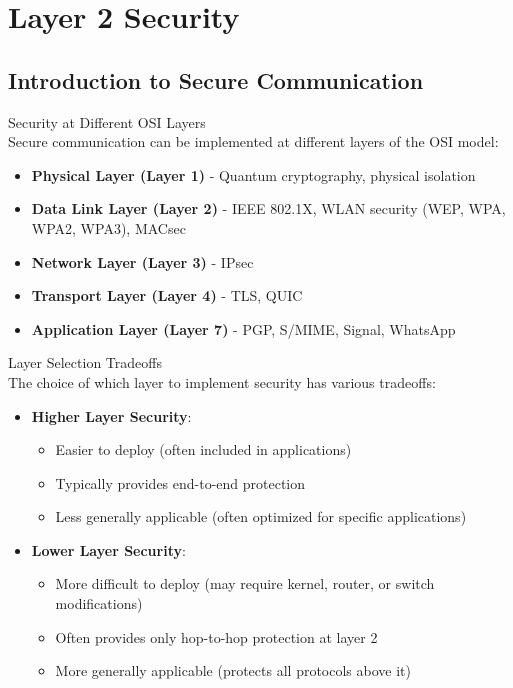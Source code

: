 \section{Layer 2 Security}

\subsection{Introduction to Secure Communication}

\begin{concept}{Security at Different OSI Layers}\\
Secure communication can be implemented at different layers of the OSI model:
\begin{itemize}
    \item \textbf{Physical Layer (Layer 1)} - Quantum cryptography, physical isolation
    \item \textbf{Data Link Layer (Layer 2)} - IEEE 802.1X, WLAN security (WEP, WPA, WPA2, WPA3), MACsec
    \item \textbf{Network Layer (Layer 3)} - IPsec
    \item \textbf{Transport Layer (Layer 4)} - TLS, QUIC
    \item \textbf{Application Layer (Layer 7)} - PGP, S/MIME, Signal, WhatsApp
\end{itemize}
\end{concept}

\begin{theorem}{Layer Selection Tradeoffs}\\
The choice of which layer to implement security has various tradeoffs:
\begin{itemize}
    \item \textbf{Higher Layer Security}:
    \begin{itemize}
        \item Easier to deploy (often included in applications)
        \item Typically provides end-to-end protection
        \item Less generally applicable (often optimized for specific applications)
    \end{itemize}
    \item \textbf{Lower Layer Security}:
    \begin{itemize}
        \item More difficult to deploy (may require kernel, router, or switch modifications)
        \item Often provides only hop-to-hop protection at layer 2
        \item More generally applicable (protects all protocols above it)
    \end{itemize}
\end{itemize}
\end{theorem}

